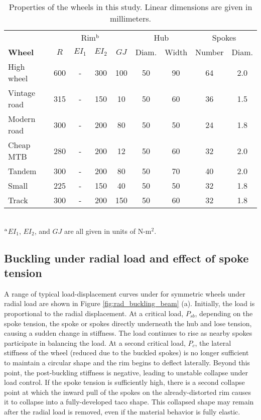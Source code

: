 \documentclass[\rootdir/thesis.tex]{subfiles}
\begin{document}
\begin{table}
\caption{Properties of the wheels in this study. Linear dimensions are given in millimeters.}
\begin{tabular}{l|cccc|cc|cc}
\hline
&\multicolumn{4}{c}{Rim$^{\rm b}$} & \multicolumn{2}{c}{Hub} & \multicolumn{2}{c}{Spokes}\\
\bf{Wheel} & $R$ & $EI_1$ & $EI_2$ & $GJ$ & Diam. & Width & Number & Diam.\\
\hline
High wheel   & 600 & - & 300 & 100 & 50 & 90 & 64 & 2.0\\
Vintage road & 315 & - & 150 & 10  & 50 & 60 & 36 & 1.5\\
Modern road  & 300 & - & 200 & 80  & 50 & 50 & 24 & 1.8\\
Cheap MTB    & 280 & - & 200 & 12  & 50 & 60 & 32 & 2.0\\
Tandem       & 300 & - & 200 & 80  & 50 & 70 & 40 & 2.0\\
Small        & 225 & - & 150 & 40  & 50 & 50 & 32 & 1.8\\
Track        & 300 & - & 200 & 150 & 50 & 60 & 32 & 1.8\\
\hline
\end{tabular}\\
$^{\rm a}$$EI_1$, $EI_2$, and $GJ$ are all given in units of N-m$^2$.
\end{table}



\subsection{Buckling under radial load and effect of spoke tension}

A range of typical load-displacement curves under for symmetric wheels under radial load are shown in Figure \ref{fig:rad_buckling_beam} (a). Initially, the load is proportional to the radial displacement. At a critical load, $P_{sb}$, depending on the spoke tension, the spoke or spokes directly underneath the hub and lose tension, causing a sudden change in stiffness. The load continues to rise as nearby spokes participate in balancing the load. At a second critical load, $P_c$, the lateral stiffness of the wheel (reduced due to the buckled spokes) is no longer sufficient to maintain a circular shape and the rim begins to deflect laterally. Beyond this point, the post-buckling stiffness is negative, leading to unstable collapse under load control. If the spoke tension is sufficiently high, there is a second collapse point at which the inward pull of the spokes on the already-distorted rim causes it to collapse into a fully-developed taco shape. This collapsed shape may remain after the radial load is removed, even if the material behavior is fully elastic.
\end{document}
